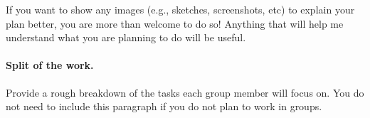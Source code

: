 \documentclass[11pt]{article}
\begin{document}
If you want to show any images (e.g., sketches, screenshots, etc) to explain your plan better, you are more than welcome to do so! Anything that will help me understand what you are planning to do will be useful.  


\paragraph{Split of the work.}
Provide  a rough breakdown of the tasks each group member will focus on. You do not need to include this paragraph if you do not plan to work in groups. 
\end{document}
